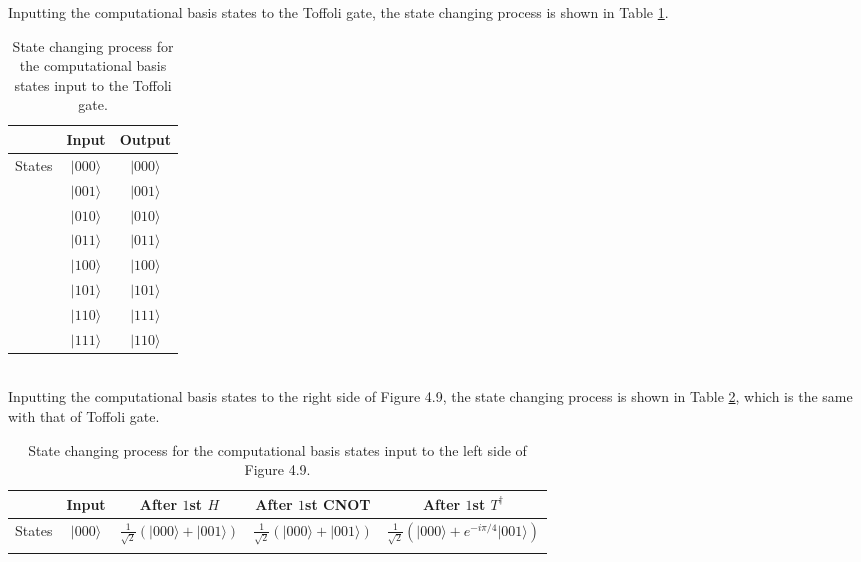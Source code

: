 \documentclass[en]{sol-man}
\begin{document}
\begin{pf}
    Inputting the computational basis states to the Toffoli gate, the state changing process is shown in Table \ref{E4.24-state-changing-process-1}.
    \begin{table}[h]
        \centering
        \caption{State changing process for the computational basis states input to the Toffoli gate.}
        \label{E4.24-state-changing-process-1}
        \begin{tabular}{|c|c|c|}
        \hline
        & Input & Output \\ \hline
        \multirow{8}{*}{States} & $\lvert 000\rangle$ & $\lvert 000\rangle$ \\ \cline{2-3} 
        & $\lvert 001\rangle$ & $\lvert 001\rangle$ \\ \cline{2-3} 
        & $\lvert 010\rangle$ & $\lvert 010\rangle$ \\ \cline{2-3} 
        & $\lvert 011\rangle$ & $\lvert 011\rangle$ \\ \cline{2-3} 
        & $\lvert 100\rangle$ & $\lvert 100\rangle$ \\ \cline{2-3} 
        & $\lvert 101\rangle$ & $\lvert 101\rangle$ \\ \cline{2-3} 
        & $\lvert 110\rangle$ & $\lvert 111\rangle$ \\ \cline{2-3} 
        & $\lvert 111\rangle$ & $\lvert 110\rangle$ \\ \hline
        \end{tabular}
    \end{table}\\
    Inputting the computational basis states to the right side of Figure 4.9, the state changing process is shown in Table \ref{E4.24-state-changing-process-2}, which is the same with that of Toffoli gate.
    \begin{table}[h]
        \centering\scriptsize
        \caption{State changing process for the computational basis states input to the left side of Figure 4.9.}
        \label{E4.24-state-changing-process-2}
        \begin{tabular}{|c|c|c|c|c|}
            \hline
             & Input & After $1$st $H$ & After $1$st CNOT & After $1$st $T^{\dagger}$ \\ \hline
            \multirow{8}{*}{States} & $\lvert 000\rangle$ & $\frac{1}{\sqrt{2}}(\lvert 000\rangle+\lvert 001\rangle)$ & $\frac{1}{\sqrt{2}}(\lvert 000\rangle+\lvert 001\rangle)$ & $\frac{1}{\sqrt{2}}(\lvert 000\rangle+e^{-i\pi/4}\lvert 001\rangle)$ \\ \cline{2-5} 

\end{tabular}
\end{table}
\end{pf}
\end{document}
